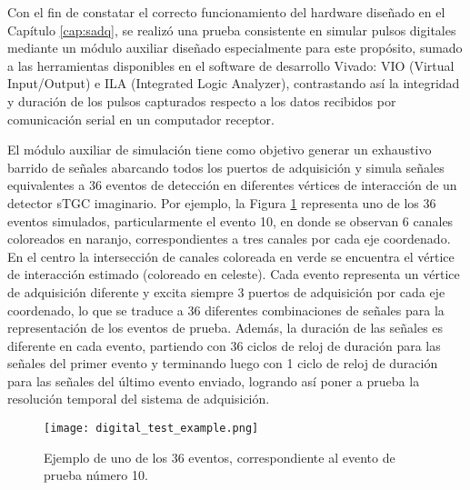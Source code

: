 
Con el fin de constatar  el correcto funcionamiento del hardware diseñado en el Capítulo \ref{cap:sadq}, se realizó una prueba consistente en simular pulsos digitales mediante un módulo auxiliar diseñado especialmente para este propósito, sumado a las herramientas disponibles en el software de desarrollo Vivado: VIO (Virtual Input/Output)\cite{XilinxVirtualSuite} e ILA (Integrated Logic Analyzer)\cite{XilinxIntegratedPG172}, contrastando así la integridad y duración de los pulsos capturados respecto a los datos recibidos por comunicación serial en un computador receptor.

El módulo auxiliar de simulación tiene como objetivo generar un exhaustivo barrido de señales abarcando todos los puertos de adquisición y simula señales equivalentes a 36 eventos de detección en diferentes vértices de interacción de un detector sTGC imaginario. Por ejemplo, la Figura \ref{img:digital_test_example} representa uno de los 36 eventos simulados, particularmente el evento 10, en donde se observan 6 canales coloreados en naranjo, correspondientes a tres canales por cada eje coordenado. En el centro la intersección de canales coloreada en verde se encuentra el vértice de interacción estimado (coloreado en celeste). Cada evento representa un vértice de adquisición diferente y excita siempre 3 puertos de adquisición por cada eje coordenado, lo que se traduce a 36 diferentes combinaciones de señales para la representación de los eventos de prueba. Además, la duración de las señales es diferente en cada evento, partiendo con 36 ciclos de reloj de duración para las señales del primer evento y terminando luego con 1 ciclo de reloj de duración para las señales del último evento enviado, logrando así poner a prueba la resolución temporal del sistema de adquisición.
	
	\begin{figure}[h]
		\centering
		\texttt{[image: digital\_test\_example.png]}
		\caption{Ejemplo de uno de los 36 eventos, correspondiente al evento de prueba número 10. }
		\label{img:digital_test_example}
	\end{figure}
	
